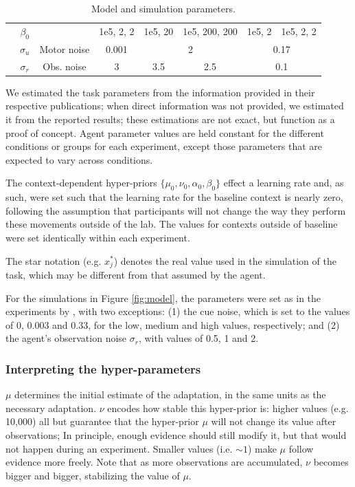 \documentclass[a4paper,doc,floatsintext,natbib]{apa6}
\def \fref #1{Figure \ref{#1}}     %
\begin{document}
\begin{table}[h!]
{\begin{tabular}{|c|c|c|c|c|c|c|c|c|c|c|}
  \cline{2-2} \cline{4-11}
  & $\beta_0$ & & 1e5, 2, 2 & \multicolumn{2}{c|}{1e5, 20} & \multicolumn{2}{c|}{1e5, 200, 200} & \multicolumn{2}{c|}{1e5, 2} & 1e5, 2, 2 \\
  \cline{2-11}
  & $\sigma_u$ & Motor noise & 0.001 & \multicolumn{4}{c|}{2} & \multicolumn{3}{c|}{0.17} \\
  \cline{2-11}
  & $\sigma_r$& Obs. noise & 3 & \multicolumn{2}{c|}{3.5} & \multicolumn{2}{c|}{2.5} & \multicolumn{3}{c|}{0.1} \\
  \cline{1-11}
  \end{tabular}}
\caption{Model and simulation parameters.}
\label{tab:parameters}
\end{table}

We estimated the task parameters from the information provided in their respective publications; when direct information was not provided, we estimated it from the reported results; these estimations are not exact, but function as a proof of concept. Agent parameter values are held constant for the different conditions or groups for each experiment, except those parameters that are expected to vary across conditions.

The context-dependent hyper-priors $\{\mu_0, \nu_0, \alpha_0, \beta_0\}$ effect a learning rate and, as such, were set such that the learning rate for the baseline context is nearly zero, following the assumption that participants will not change the way they perform these movements outside of the lab. The values for contexts outside of baseline were set identically within each experiment.

The star notation (e.g. $x_j^*$) denotes the real value used in the simulation of the task, which may be different from that assumed by the agent.

For the simulations in \fref{fig:model}, the parameters were set as in the experiments by \cite{Davidson_Scaling_2004}, with two exceptions: (1) the cue noise, which is set to the values of 0, 0.003 and 0.33, for the low, medium and high values, respectively; and (2) the agent's observation noise $\sigma_r$, with values of 0.5, 1 and 2.

\subsubsection{Interpreting the hyper-parameters}
\label{sec:interpreting-hyperparameters}
$\mu$ determines the initial estimate of the adaptation, in the same units as
the necessary adaptation. $\nu$ encodes how stable this hyper-prior is: higher
values (e.g. 10,000) all but guarantee that the hyper-prior $\mu$ will not
change its value after observations; In principle, enough evidence should still
modify it, but that would not happen during an experiment. Smaller values
(i.e. $\sim 1$) make $\mu$ follow evidence more freely. Note that as more
observations are accumulated, $\nu$ becomes bigger and bigger, stabilizing the
value of $\mu$.
\end{document}
